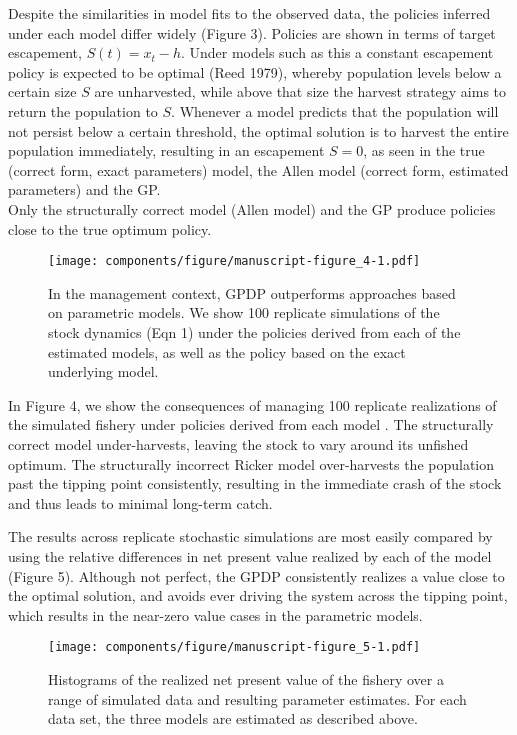 \documentclass[author-year, 12pt,review]{components/elsarticle} %
\makeatletter
\def\maxwidth{\ifdim\Gin@nat@width>\linewidth\linewidth
\else\Gin@nat@width\fi}
\let\Oldincludegraphics\includegraphics
\renewcommand{\includegraphics}[1]{\Oldincludegraphics[width=\maxwidth]{#1}}
\makeatother
\begin{document}
Despite the similarities in model fits to the observed data, the
policies inferred under each model differ widely (Figure 3). Policies
are shown in terms of target escapement, $S(t) = x_t - h$. Under models
such as this a constant escapement policy is expected to be optimal
(Reed 1979), whereby population levels below a certain size $S$ are
unharvested, while above that size the harvest strategy aims to return
the population to $S$. Whenever a model predicts that the population
will not persist below a certain threshold, the optimal solution is to
harvest the entire population immediately, resulting in an escapement
$S=0$, as seen in the true (correct form, exact parameters) model, the
Allen model (correct form, estimated parameters) and the GP.\\Only the
structurally correct model (Allen model) and the GP produce policies
close to the true optimum policy.

\begin{figure}[htbp]
\centering
\texttt{[image: components/figure/manuscript-figure\_4-1.pdf]}
\caption{In the management context, GPDP outperforms approaches based on
parametric models. We show 100 replicate simulations of the stock
dynamics (Eqn 1) under the policies derived from each of the estimated
models, as well as the policy based on the exact underlying model.}
\end{figure}

In Figure 4, we show the consequences of managing 100 replicate
realizations of the simulated fishery under policies derived from each
model . The structurally correct model under-harvests, leaving the stock
to vary around its unfished optimum. The structurally incorrect Ricker
model over-harvests the population past the tipping point consistently,
resulting in the immediate crash of the stock and thus leads to minimal
long-term catch.

The results across replicate stochastic simulations are most easily
compared by using the relative differences in net present value realized
by each of the model (Figure 5). Although not perfect, the GPDP
consistently realizes a value close to the optimal solution, and avoids
ever driving the system across the tipping point, which results in the
near-zero value cases in the parametric models.

\begin{figure}[htbp]
\centering
\texttt{[image: components/figure/manuscript-figure\_5-1.pdf]}
\caption{Histograms of the realized net present value of the fishery
over a range of simulated data and resulting parameter estimates. For
each data set, the three models are estimated as described above.}
\end{figure}
\end{document}

